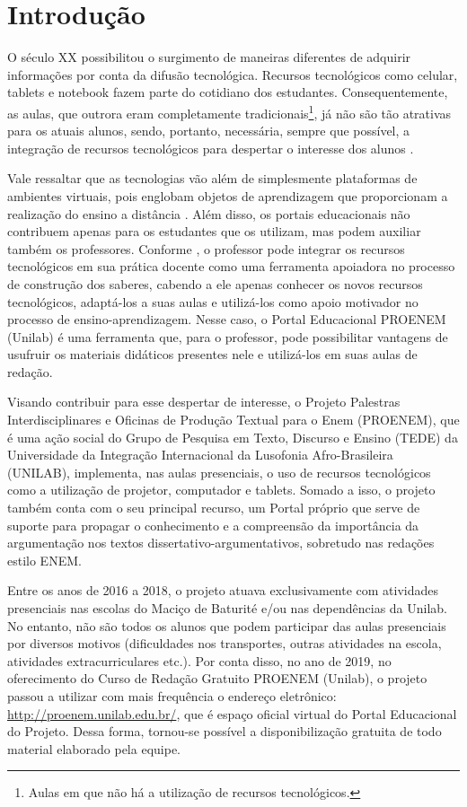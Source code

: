 \documentclass{textolivre}
\begin{document}
\section{Introdução}\label{sec-intro}
O século XX possibilitou o surgimento de maneiras diferentes de adquirir informações por conta da difusão tecnológica. Recursos tecnológicos como celular, tablets e notebook fazem parte do cotidiano dos estudantes. Consequentemente, as aulas, que outrora eram completamente tradicionais\footnote{Aulas em que não há a utilização de recursos tecnológicos.}, já não são tão atrativas para os atuais alunos, sendo, portanto, necessária, sempre que possível, a integração de recursos tecnológicos para despertar o interesse dos alunos \cite{ferrari2017}.

Vale ressaltar que as tecnologias vão além de simplesmente plataformas de ambientes virtuais, pois englobam objetos de aprendizagem que proporcionam a realização do ensino a distância \cite{meirelles2017}. Além disso, os portais educacionais não contribuem apenas para os estudantes que os utilizam, mas podem auxiliar também os professores. Conforme \textcite{ferrari2017}, o professor pode integrar os recursos tecnológicos em sua prática docente como uma ferramenta apoiadora no processo de construção dos saberes, cabendo a ele apenas conhecer os novos recursos tecnológicos, adaptá-los a suas aulas e utilizá-los como apoio motivador no processo de ensino-aprendizagem. Nesse caso, o Portal Educacional PROENEM (Unilab) é uma ferramenta que, para o professor, pode possibilitar vantagens de usufruir os materiais didáticos presentes nele e utilizá-los em suas aulas de redação. 

Visando contribuir para esse despertar de interesse, o Projeto Palestras Interdisciplinares e Oficinas de Produção Textual para o Enem (PROENEM), que é uma ação social do Grupo de Pesquisa em Texto, Discurso e Ensino (TEDE) da Universidade da Integração Internacional da Lusofonia Afro-Brasileira (UNILAB), implementa, nas aulas presenciais, o uso de recursos tecnológicos como a utilização de projetor, computador e tablets. Somado a isso, o projeto também conta com o seu principal recurso, um Portal próprio que serve de suporte para propagar o conhecimento e a compreensão da importância da argumentação nos textos dissertativo-argumentativos, sobretudo nas redações estilo ENEM.

Entre os anos de 2016 a 2018, o projeto atuava exclusivamente com atividades presenciais nas escolas do Maciço de Baturité e/ou nas dependências da Unilab. No entanto, não são todos os alunos que podem participar das aulas presenciais por diversos motivos (dificuldades nos transportes, outras atividades na escola, atividades extracurriculares etc.). Por conta disso, no ano de 2019, no oferecimento do Curso de Redação Gratuito PROENEM (Unilab), o projeto passou a utilizar com mais frequência o endereço eletrônico: \url{http://proenem.unilab.edu.br/}, que é espaço oficial virtual do Portal Educacional do Projeto. Dessa forma, tornou-se possível a disponibilização gratuita de todo material elaborado pela equipe. 
\end{document}

